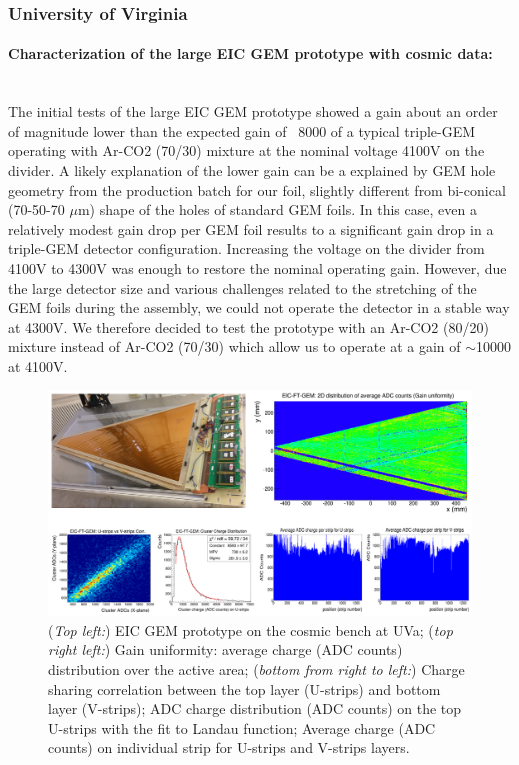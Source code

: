 \subsubsection{University of Virginia} 
\paragraph*{Characterization of the large EIC GEM prototype with cosmic data:}\mbox{}\\
The initial tests of the large EIC GEM prototype showed  a gain about an order of magnitude lower than the expected gain of ~8000 of a typical triple-GEM operating with  Ar-CO2 (70/30) mixture at the nominal voltage 4100V on the divider. A likely explanation of the lower gain can be a explained by GEM hole geometry from the production batch for our foil, slightly different from  bi-conical (70-50-70 $\mu$m) shape  of the holes of standard GEM foils. In this case, even a relatively modest gain drop per GEM foil results to a significant gain drop in a triple-GEM detector configuration. Increasing the voltage on the divider from 4100V to 4300V was enough to restore the nominal operating gain. However, due the large detector size and various challenges related to the  stretching of the GEM foils during the assembly, we could not operate the detector in a stable way at 4300V. We therefore decided to test the prototype with an Ar-CO2 (80/20) mixture instead of Ar-CO2 (70/30) which allow us to operate at a gain of $\sim$10000  at 4100V.\\
% 
\begin{figure}[htb]
\centering
\includegraphics[width=1\columnwidth,trim={0pt 0mm 0pt 0mm},clip]{UVa_plots/eicCosmic}
\caption{\label{fig:eicCosmic}({\it Top left:}) EIC GEM prototype on the cosmic bench at UVa;  ({\it top right left:}) Gain uniformity: average charge (ADC counts) distribution over the active area; ({\it bottom from right to left:}) Charge sharing correlation between the top layer (U-strips) and bottom layer (V-strips); ADC charge distribution (ADC counts) on the top U-strips with the fit to Landau function;  Average charge (ADC counts) on  individual strip for U-strips and V-strips layers.}
\end{figure}
